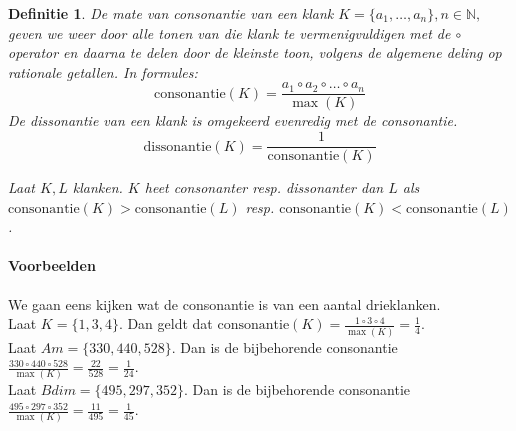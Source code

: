 \documentclass[a4paper]{article}
\newtheorem{dfn}[st]{Definitie}
\begin{document}
\newcommand{\consonantie}{\mathrm{consonantie}}
\newcommand{\dissonantie}{\mathrm{dissonantie}}
\begin{dfn}
	De mate van consonantie van een klank $K = \{a_1, \dots ,a_n\}, n\in \mathbb{N},$ geven we weer door alle tonen van die klank te vermenigvuldigen met de $\circ$ operator en daarna te delen door de kleinste toon, volgens de algemene deling op rationale getallen.
	In formules:
	\begin{equation}
		\consonantie(K) = \frac{a_1\circ a_2\circ  \dots \circ a_n}{\max(K)}
	\end{equation}
	De dissonantie van een klank is omgekeerd evenredig met de consonantie.
	\begin{equation}
		\dissonantie(K) = \frac{1}{\consonantie(K)}
	\end{equation}

	Laat $K,L$ klanken. $K$ heet consonanter resp. dissonanter dan $L$ als $\consonantie(K) > \consonantie(L)$ resp. $\consonantie(K) < \consonantie(L)$.
\end{dfn}

\paragraph{Voorbeelden}
We gaan eens kijken wat de consonantie is van een aantal drieklanken.\\
Laat $K = \{1,3,4\}$. Dan geldt dat $\consonantie(K) = \frac{1\circ 3\circ 4}{\max(K)} = \frac{1}{4}$. \\
Laat $Am = \{330,440,528\}$. Dan is de bijbehorende consonantie $\frac{330\circ 440\circ 528}{\max(K)} = \frac{22}{528} = \frac{1}{24}$.\\
Laat $Bdim = \{495,297,352\}$. Dan is de bijbehorende consonantie $\frac{495\circ 297\circ 352}{\max(K)} = \frac{11}{495} = \frac{1}{45}$.
\end{document}
